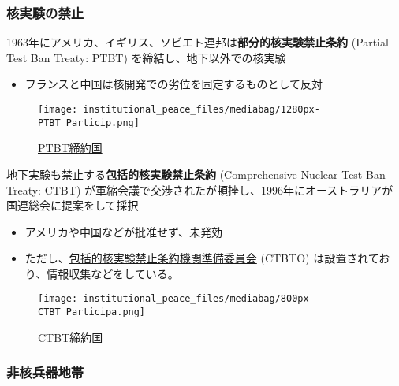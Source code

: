 \documentclass[
  xelatex,
  ja=standard]{bxjsarticle}
\providecommand{\tightlist}{%
  \setlength{\itemsep}{0pt}\setlength{\parskip}{0pt}}\usepackage{longtable,booktabs,array}
\begin{document}
\hypertarget{ux6838ux5b9fux9a13ux306eux7981ux6b62}{%
\subsubsection{核実験の禁止}\label{ux6838ux5b9fux9a13ux306eux7981ux6b62}}

1963年にアメリカ、イギリス、ソビエト連邦は\textbf{部分的核実験禁止条約}
(Partial Test Ban Treaty: PTBT) を締結し、地下以外での核実験

\begin{itemize}
\tightlist
\item
  フランスと中国は核開発での劣位を固定するものとして反対
\end{itemize}

\begin{figure}[htpb]

{\centering \texttt{[image: institutional\_peace\_files/mediabag/1280px-PTBT\_Particip.png]}

}

\caption{\href{https://commons.wikimedia.org/wiki/File:PTBT_Participation.svg}{PTBT締約国}}

\end{figure}

地下実験も禁止する\href{https://www.mofa.go.jp/mofaj/gaiko/kaku/ctbt/index.html}{\textbf{包括的核実験禁止条約}}
(Comprehensive Nuclear Test Ban Treaty: CTBT)
が軍縮会議で交渉されたが頓挫し、1996年にオーストラリアが国連総会に提案をして採択

\begin{itemize}
\tightlist
\item
  アメリカや中国などが批准せず、未発効
\item
  ただし、\href{https://www.unic.or.jp/info/un/unsystem/specialized_agencies/ctbto/}{包括的核実験禁止条約機関準備委員会}
  (CTBTO) は設置されており、情報収集などをしている。
\end{itemize}

\begin{figure}[htpb]

{\centering \texttt{[image: institutional\_peace\_files/mediabag/800px-CTBT\_Participa.png]}

}

\caption{\href{https://commons.wikimedia.org/wiki/File:CTBT_Participation.svg}{CTBT締約国}}

\end{figure}

\hypertarget{ux975eux6838ux5175ux5668ux5730ux5e2f}{%
\subsubsection{非核兵器地帯}\label{ux975eux6838ux5175ux5668ux5730ux5e2f}}
\end{document}
